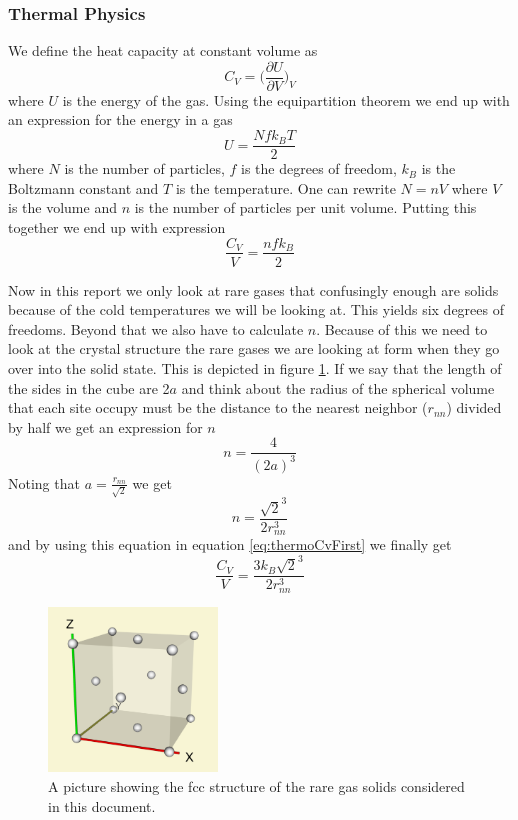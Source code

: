 \documentclass[11pt]{article}
\begin{document}
\subsubsection{Thermal Physics}
We define the heat capacity at constant volume as
\begin{equation}
	C_V = \Big(\frac{\partial U}{\partial V}\Big)_V
\end{equation}
where $U$ is the energy of the gas. Using the equipartition theorem we end up with an expression for the energy in a gas\cite{bib:thermo}
\begin{equation}
	U = \frac{Nfk_BT}{2}
\end{equation}
where $N$ is the number of particles, $f$ is the degrees of freedom, $k_B$ is the Boltzmann constant and $T$ is the temperature.  One can rewrite $N = nV$ where $V$ is the volume and $n$ is the number of particles per unit volume. Putting this together we end up with expression
\begin{equation}
	\frac{C_V}{V} = \frac{nfk_B}{2}
	\label{eq:thermoCvFirst}
\end{equation}

Now in this report we only look at rare gases that confusingly enough are solids because of the cold temperatures we will be looking at. This yields six degrees of freedoms. Beyond that we also have to calculate $n$. Because of this we need to look at the crystal structure the rare gases we are looking at form when they go over into the solid state. This is depicted in figure \ref{fig:fcc}. If we say that the length of the sides in the cube are 2$a$  and think about the radius of the spherical volume that each site occupy must be the distance to the nearest neighbor ($r_{nn}$) divided by half we get an expression for $n$
\begin{equation}
	n = \frac{4}{(2a)^3}
\end{equation}
Noting that $a = \frac{r_{nn}}{\sqrt{2}}$ we get
\begin{equation}
	n = \frac{\sqrt{2}^3}{2r_{nn}^3}
	\label{eq:n}
\end{equation}
and by using this equation in equation \ref{eq:thermoCvFirst} we finally get 
\begin{equation}
	\frac{C_V}{V} = \frac{3k_B\sqrt{2}^3}{2r_{nn}^3}
	\label{eq:thermoCv}
\end{equation}

\begin{figure}[H]
	\centering
	\includegraphics[width=0.4\textwidth]{fcc.png}
	\caption{A picture showing the fcc structure of the rare gas solids considered in this document.}
	\label{fig:fcc}
\end{figure}
\end{document}
